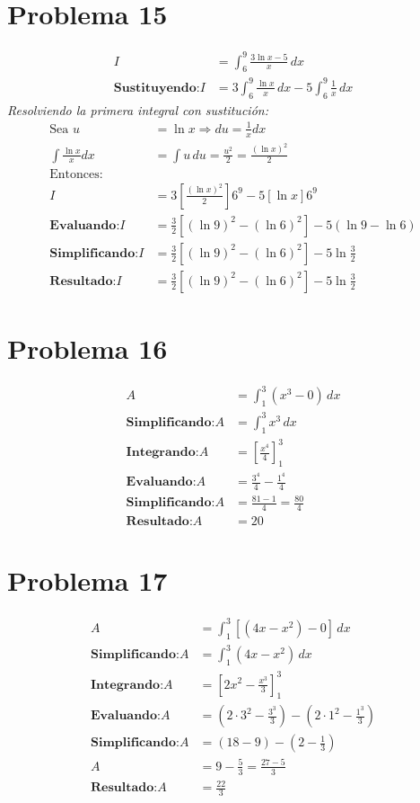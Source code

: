 \documentclass[12pt]{article}
\newcommand{\problema}[1]{\section*{Problema #1}}
\newcommand{\sustituyendo}{\textbf{Sustituyendo:} }
\newcommand{\integrando}{\textbf{Integrando:} }
\newcommand{\evaluando}{\textbf{Evaluando:} }
\newcommand{\simplificando}{\textbf{Simplificando:} }
\newcommand{\obteniendo}{\textbf{Resultado:} }
\begin{document}
	\problema{15}
	\begin{align*}
		I &= \int_{6}^{9} \frac{3 \ln x - 5}{x} \, dx \\
		\sustituyendo I &= 3 \int_{6}^{9} \frac{\ln x}{x} \, dx - 5 \int_{6}^{9} \frac{1}{x} \, dx
	\end{align*}
	\textit{Resolviendo la primera integral con sustitución:}
	\begin{align*}
		\text{Sea } u &= \ln x \Rightarrow du = \frac{1}{x} dx \\
		\int \frac{\ln x}{x} dx &= \int u \, du = \frac{u^2}{2} = \frac{(\ln x)^2}{2} \\
		\text{Entonces:} \\
		I &= 3 \left[ \frac{(\ln x)^2}{2} \right]{6}^{9} - 5 \left[ \ln x \right]{6}^{9} \\
		\evaluando I &= \frac{3}{2} \left[ (\ln 9)^2 - (\ln 6)^2 \right] - 5(\ln 9 - \ln 6) \\
		\simplificando I &= \frac{3}{2} \left[ (\ln 9)^2 - (\ln 6)^2 \right] - 5 \ln \frac{3}{2} \\
		\obteniendo I &= \boxed{\frac{3}{2} \left[ (\ln 9)^2 - (\ln 6)^2 \right] - 5 \ln \frac{3}{2}}
	\end{align*}
	
	\vspace{0.5cm}
	
	\problema{16}
	\begin{align*}
		A &= \int_{1}^{3} (x^{3} - 0) \, dx \\
		\simplificando A &= \int_{1}^{3} x^{3} \, dx \\
		\integrando A &= \left[ \frac{x^{4}}{4} \right]_{1}^{3} \\
		\evaluando A &= \frac{3^{4}}{4} - \frac{1^{4}}{4} \\
		\simplificando A &= \frac{81 - 1}{4} = \frac{80}{4} \\
		\obteniendo A &= \boxed{20}
	\end{align*}
	
	\vspace{0.5cm}
	
	\problema{17}
	\begin{align*}
		A &= \int_{1}^{3} \left[ (4x - x^{2}) - 0 \right] \, dx \\
		\simplificando A &= \int_{1}^{3} (4x - x^{2}) \, dx \\
		\integrando A &= \left[ 2x^{2} - \frac{x^{3}}{3} \right]_{1}^{3} \\
		\evaluando A &= \left(2\cdot 3^2 - \frac{3^3}{3}\right) - \left(2\cdot 1^2 - \frac{1^3}{3}\right) \\
		\simplificando A &= (18 - 9) - \left(2 - \frac{1}{3}\right) \\
		A &= 9 - \frac{5}{3} = \frac{27 - 5}{3} \\
		\obteniendo A &= \boxed{\frac{22}{3}}
	\end{align*}
	
\end{document}
